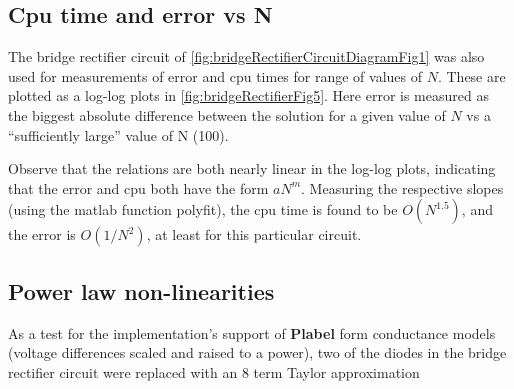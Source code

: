 \subsection{Cpu time and error vs N}

The bridge rectifier circuit of
\cref{fig:bridgeRectifierCircuitDiagramFig1} was also used for
measurements of error and cpu times for range of values of \( N \).
These are plotted as a log-log plots in
\cref{fig:bridgeRectifierFig5}.
Here error is measured as the biggest absolute difference between the solution for a given value of \( N \) vs
a ``sufficiently large'' value of N (100).


Observe that the relations are both nearly linear in the log-log plots, indicating that the error and cpu both have the form \( a N^m \).
Measuring the respective slopes (using the matlab function polyfit), the cpu time is found to be \( O(N^{1.5}) \), and the error is \( O(1/N^2) \), at least for this particular circuit.


\subsection{Power law non-linearities}

As a test for the implementation's support of \textbf{Plabel} form conductance models (voltage differences scaled and raised to a power),
two of the diodes in the bridge rectifier circuit were replaced with an 8 term Taylor approximation

